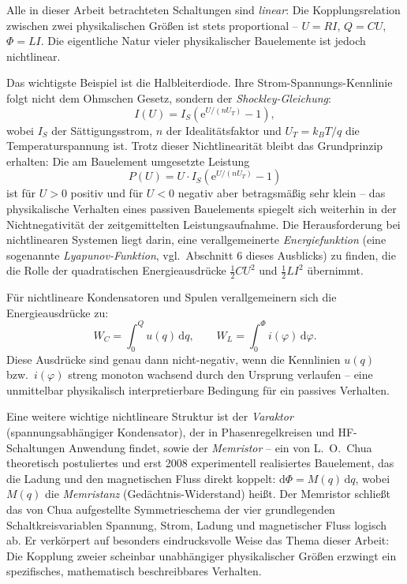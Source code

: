 ﻿\documentclass[12pt, a4paper]{article}
\begin{document}
	Alle in dieser Arbeit betrachteten Schaltungen sind \textit{linear}: Die Kopplungsrelation zwischen zwei physikalischen Größen ist stets proportional -- $U = RI$, $Q = CU$, $\Phi = LI$. Die eigentliche Natur vieler physikalischer Bauelemente ist jedoch nichtlinear.

	Das wichtigste Beispiel ist die Halbleiterdiode. Ihre Strom-Spannungs-Kennlinie folgt nicht dem Ohmschen Gesetz, sondern der \textit{Shockley-Gleichung}:
	\begin{equation}
		I(U) = I_S \left(\mathrm{e}^{U/(n U_T)} - 1\right),
	\end{equation}
	wobei $I_S$ der Sättigungsstrom, $n$ der Idealitätsfaktor und $U_T = k_B T / q$ die Temperaturspannung ist. Trotz dieser Nichtlinearität bleibt das Grundprinzip erhalten: Die am Bauelement umgesetzte Leistung
	\begin{equation}
		P(U) = U \cdot I_S \left(\mathrm{e}^{U/(n U_T)} - 1\right)
	\end{equation}
	ist für $U > 0$ positiv und für $U < 0$ negativ aber betragsmäßig sehr klein -- das physikalische Verhalten eines passiven Bauelements spiegelt sich weiterhin in der Nichtnegativität der zeitgemittelten Leistungsaufnahme. Die Herausforderung bei nichtlinearen Systemen liegt darin, eine verallgemeinerte \textit{Energiefunktion} (eine sogenannte \textit{Lyapunov-Funktion}, vgl.\ Abschnitt 6 dieses Ausblicks) zu finden, die die Rolle der quadratischen Energieausdrücke $\frac{1}{2}CU^2$ und $\frac{1}{2}LI^2$ übernimmt.

	Für nichtlineare Kondensatoren und Spulen verallgemeinern sich die Energieausdrücke zu:
	\begin{equation}
		W_C = \int_0^Q u(q)\,\mathrm{d}q, \qquad W_L = \int_0^\Phi i(\varphi)\,\mathrm{d}\varphi.
	\end{equation}
	Diese Ausdrücke sind genau dann nicht-negativ, wenn die Kennlinien $u(q)$ bzw.\ $i(\varphi)$ streng monoton wachsend durch den Ursprung verlaufen -- eine unmittelbar physikalisch interpretierbare Bedingung für ein passives Verhalten.

	Eine weitere wichtige nichtlineare Struktur ist der \textit{Varaktor} (spannungsabhängiger Kondensator), der in Phasenregelkreisen und HF-Schaltungen Anwendung findet, sowie der \textit{Memristor} -- ein von L.~O.~Chua~\cite{chua1969} theoretisch postuliertes und erst 2008 experimentell realisiertes Bauelement, das die Ladung und den magnetischen Fluss direkt koppelt: $\mathrm{d}\Phi = M(q)\,\mathrm{d}q$, wobei $M(q)$ die \textit{Memristanz} (Gedächtnis-Widerstand) heißt. Der Memristor schließt das von Chua aufgestellte Symmetrieschema der vier grundlegenden Schaltkreisvariablen Spannung, Strom, Ladung und magnetischer Fluss logisch ab. Er verkörpert auf besonders eindrucksvolle Weise das Thema dieser Arbeit: Die Kopplung zweier scheinbar unabhängiger physikalischer Größen erzwingt ein spezifisches, mathematisch beschreibbares Verhalten.
\end{document}
